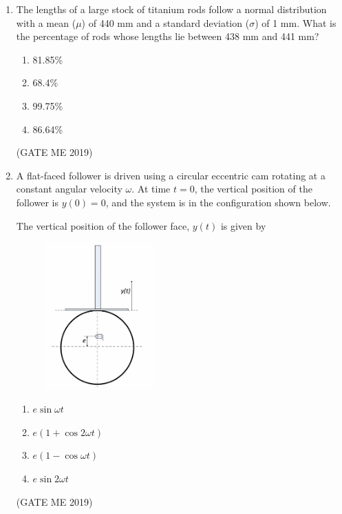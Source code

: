 \documentclass[journal]{IEEEtran}
\begin{document}
\begin{enumerate}
\item The lengths of a large stock of titanium rods follow a normal distribution with a mean ($\mu$) of 440 mm and a standard deviation ($\sigma$) of 1 mm. What is the percentage of rods whose lengths lie between 438 mm and 441 mm?
\begin{multicols}{4}
\begin{enumerate}
    \item 81.85\%
    \item 68.4\%
    \item 99.75\%
    \item 86.64\%
\end{enumerate}
\end{multicols}
\hfill (GATE ME 2019)

\item A flat-faced follower is driven using a circular eccentric cam rotating at a constant angular velocity $ \omega $. At time $ t = 0 $, the vertical position of the follower is $ y(0) = 0 $, and the system is in the configuration shown below.

The vertical position of the follower face, $ y(t) $ is given by

\begin{figure}[H]
\centering
\includegraphics[width=0.4\textwidth]{Fig 3.png}
\caption{}
\label{fig:question5}
\end{figure}

\begin{multicols}{4}
\begin{enumerate}
    \item $ e \sin \omega t $
    \item $ e(1 + \cos 2\omega t) $
    \item $ e(1 - \cos \omega t) $
    \item $ e \sin 2\omega t $
\end{enumerate}
\end{multicols}
\hfill (GATE ME 2019)


\end{enumerate}
\end{document}
